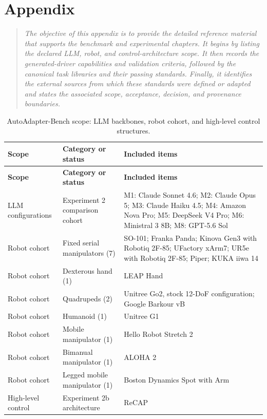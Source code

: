 \chapter{Appendix}
\label{chap:appendix}

\begin{quote}\itshape
The objective of this appendix is to provide the detailed reference material
that supports the benchmark and experimental chapters. It begins by listing
the declared LLM, robot, and control-architecture scope. It then records the
generated-driver capabilities and validation criteria, followed by the
canonical task libraries and their passing standards. Finally, it identifies
the external sources from which these standards were defined or adapted and
states the associated scope, acceptance, decision, and provenance boundaries.
\end{quote}

\begingroup
\small
{}
\renewcommand{\arraystretch}{1.15}
\begin{longtable}{@{}>{\raggedright\arraybackslash}p{20mm}>{\raggedright\arraybackslash}p{32mm}>{\raggedright\arraybackslash}p{74mm}@{}}
\caption{AutoAdapter-Bench scope: LLM backbones, robot cohort, and high-level control structures.}
\label{tab:appendix-benchmark-scope}\\
\toprule
\textbf{Scope} & \textbf{Category or status} & \textbf{Included items} \\
\midrule
\endfirsthead
\toprule
\textbf{Scope} & \textbf{Category or status} & \textbf{Included items} \\
\midrule
\endhead
\endfoot
\bottomrule
\endlastfoot
LLM configurations & Experiment 2 comparison cohort & M1: Claude Sonnet 4.6; M2: Claude Opus 5; M3: Claude Haiku 4.5; M4: Amazon Nova Pro; M5: DeepSeek V4 Pro; M6: Ministral 3 8B; M8: GPT-5.6 Sol \\
Robot cohort & Fixed serial manipulators (7) & SO-101; Franka Panda; Kinova Gen3 with Robotiq 2F-85; UFactory xArm7; UR5e with Robotiq 2F-85; Piper; KUKA iiwa 14 \\
Robot cohort & Dexterous hand (1) & LEAP Hand \\
Robot cohort & Quadrupeds (2) & Unitree Go2, stock 12-DoF configuration; Google Barkour vB \\
Robot cohort & Humanoid (1) & Unitree G1 \\
Robot cohort & Mobile manipulator (1) & Hello Robot Stretch 2 \\
Robot cohort & Bimanual manipulator (1) & ALOHA 2 \\
Robot cohort & Legged mobile manipulator (1) & Boston Dynamics Spot with Arm \\
High-level control & Experiment 2b architecture & ReCAP \citep{zhang2025recap} \\
\end{longtable}

